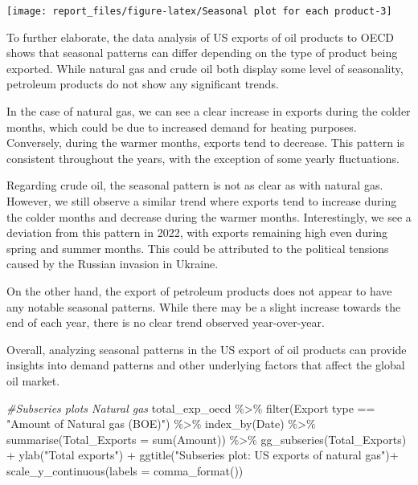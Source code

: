 \documentclass[
]{article}
\newenvironment{Shaded}{\begin{snugshade}}{\end{snugshade}}
\newcommand{\AttributeTok}[1]{\textcolor[rgb]{0.77,0.63,0.00}{#1}}
\newcommand{\CommentTok}[1]{\textcolor[rgb]{0.56,0.35,0.01}{\textit{#1}}}
\newcommand{\FunctionTok}[1]{\textcolor[rgb]{0.00,0.00,0.00}{#1}}
\newcommand{\NormalTok}[1]{#1}
\newcommand{\SpecialCharTok}[1]{\textcolor[rgb]{0.00,0.00,0.00}{#1}}
\newcommand{\StringTok}[1]{\textcolor[rgb]{0.31,0.60,0.02}{#1}}
\begin{document}
\begin{center}\texttt{[image: report\_files/figure-latex/Seasonal plot for each product-3]} \end{center}

To further elaborate, the data analysis of US exports of oil products to
OECD shows that seasonal patterns can differ depending on the type of
product being exported. While natural gas and crude oil both display
some level of seasonality, petroleum products do not show any
significant trends.

In the case of natural gas, we can see a clear increase in exports
during the colder months, which could be due to increased demand for
heating purposes. Conversely, during the warmer months, exports tend to
decrease. This pattern is consistent throughout the years, with the
exception of some yearly fluctuations.

Regarding crude oil, the seasonal pattern is not as clear as with
natural gas. However, we still observe a similar trend where exports
tend to increase during the colder months and decrease during the warmer
months. Interestingly, we see a deviation from this pattern in 2022,
with exports remaining high even during spring and summer months. This
could be attributed to the political tensions caused by the Russian
invasion in Ukraine.

On the other hand, the export of petroleum products does not appear to
have any notable seasonal patterns. While there may be a slight increase
towards the end of each year, there is no clear trend observed
year-over-year.

Overall, analyzing seasonal patterns in the US export of oil products
can provide insights into demand patterns and other underlying factors
that affect the global oil market.

\begin{Shaded}
\begin{Highlighting}[]
\CommentTok{\#Subseries plots Natural gas}
\NormalTok{total\_exp\_oecd }\SpecialCharTok{\%\textgreater{}\%} \FunctionTok{filter}\NormalTok{(}\StringTok{\textasciigrave{}}\AttributeTok{Export type}\StringTok{\textasciigrave{}} \SpecialCharTok{==} \StringTok{"Amount of Natural gas (BOE)"}\NormalTok{) }\SpecialCharTok{\%\textgreater{}\%} 
  \FunctionTok{index\_by}\NormalTok{(Date) }\SpecialCharTok{\%\textgreater{}\%} 
  \FunctionTok{summarise}\NormalTok{(}\AttributeTok{Total\_Exports =} \FunctionTok{sum}\NormalTok{(}\StringTok{\textasciigrave{}}\AttributeTok{Amount}\StringTok{\textasciigrave{}}\NormalTok{)) }\SpecialCharTok{\%\textgreater{}\%} 
  \FunctionTok{gg\_subseries}\NormalTok{(Total\_Exports) }\SpecialCharTok{+} 
  \FunctionTok{ylab}\NormalTok{(}\StringTok{"Total exports"}\NormalTok{) }\SpecialCharTok{+} 
  \FunctionTok{ggtitle}\NormalTok{(}\StringTok{"Subseries plot: US exports of natural gas"}\NormalTok{)}\SpecialCharTok{+}
  \FunctionTok{scale\_y\_continuous}\NormalTok{(}\AttributeTok{labels =} \FunctionTok{comma\_format}\NormalTok{())}
\end{Highlighting}
\end{Shaded}
\end{document}
